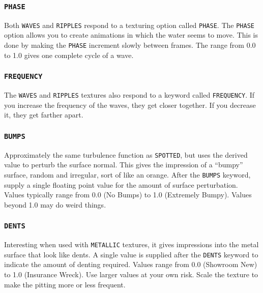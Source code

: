 \subsubsection{{\tt PHASE}}

Both {\tt WAVES} and {\tt RIPPLES} respond to a texturing option
called {\tt PHASE}.  The {\tt PHASE} option allows you to create
animations in which the water seems to move.  This is done by making
the {\tt PHASE} increment slowly between frames.  The range from 0.0
to 1.0 gives one complete cycle of a wave.

\subsubsection{{\tt FREQUENCY}}

The {\tt WAVES} and {\tt RIPPLES} textures also respond to a keyword
called {\tt FREQUENCY}.  If you increase the frequency of the waves,
they get closer together.  If you decrease it, they get farther apart.


\subsubsection{{\tt BUMPS}}

Approximately the same turbulence function as
{\tt SPOTTED}, but uses
the derived value to perturb the surface normal.  This gives the
impression of a ``bumpy'' surface, random and irregular, sort of like
an orange.  After the {\tt BUMPS} keyword, supply a single floating
point value for the amount of surface perturbation.  Values typically
range from 0.0 (No Bumps) to 1.0 (Extremely Bumpy).  Values beyond 1.0
may do weird things.

\subsubsection{{\tt DENTS}}

Interesting when used with
{\tt METALLIC} textures, it gives impressions into
the metal surface that
look like dents.  A single value is supplied after the {\tt DENTS}
keyword to indicate the amount of denting required.  Values range from
0.0 (Showroom New) to 1.0 (Insurance Wreck).  Use larger values at
your own risk.  Scale the texture to make the pitting more or less
frequent.

